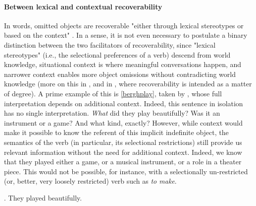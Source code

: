 \paragraph{Between lexical and contextual recoverability}

In  words, omitted objects are recoverable "either through lexical stereotypes or based on the context" \parencite[7]{Kardos2010}. In a sense, it is not even necessary to postulate a binary distinction between the two facilitators of recoverability, since "lexical stereotypes" (i.e., the selectional preferences of a verb) descend from world knowledge, situational context is where meaningful conversations happen, and narrower context enables more object omissions without contradicting world knowledge (more on this in , and in \textcite{Glass2013, Glass2020, glass2022english}, where recoverability is intended as a matter of degree). A prime example of this is \ref{berghplay}, taken by \textcite[24]{BerghOhlander2016}, whose full interpretation depends on additional context. Indeed, this sentence in isolation has no single interpretation. \textit{What} did they play beautifully? Was it an instrument or a game? And what kind, exactly? However, while context would make it possible to know the referent of this implicit indefinite object, the semantics of the verb (in particular, its selectional restrictions) still provide us relevant information without the need for additional context. Indeed, we know that they played either a game, or a musical instrument, or a role in a theater piece. This would not be possible, for instance, with a selectionally un-restricted (or, better, very loosely restricted) verb such as \textit{to make}.

\ex. \label{berghplay} They played beautifully.

